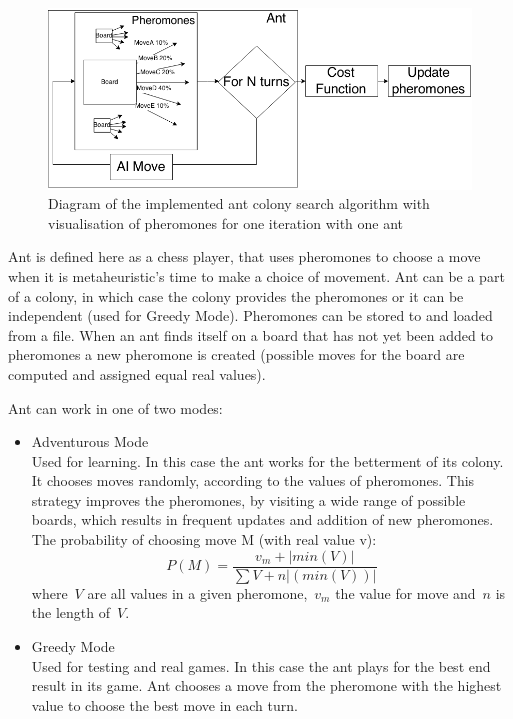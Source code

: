 \documentclass[pdftex]{article}
\begin{document}
\begin{figure}[!htb]
	\centering
	\includegraphics[width=1\textwidth]{ant/pheromones.png} 
	\caption{Diagram of the implemented ant colony search algorithm with visualisation of pheromones for one iteration with one ant}
	\label{fig:pheromones}
\end{figure}

Ant is defined here as a chess player, that uses pheromones to choose a move when it is metaheuristic's time to make a choice of movement. Ant can be a part of a colony, in which case the colony provides the pheromones or it can be independent (used for Greedy Mode). Pheromones can be stored to and loaded from a file. When an ant finds itself on a board that has not yet been added to pheromones a new pheromone is created (possible moves for the board are computed and assigned equal real values).

 Ant can work in one of two modes: 
\begin{itemize}
 	\item Adventurous Mode \hfill \\
		Used for learning. In this case the ant works for the betterment of its colony. It chooses moves randomly, according to the values of pheromones. This strategy improves the pheromones, by visiting a wide range of possible boards, which results in frequent updates and addition of new pheromones. The probability of choosing move M (with real value v):
\begin{equation}
\label{eq:choosingequation}
	P(M) = \frac{v_m + |min(V)|}{\sum V + n|(min(V))|}
\end{equation}
where~$V$ are all values in a given pheromone,~$v_m$ the value for move and~$n$ is the length of~$V$.

	\item Greedy Mode \hfill \\
		Used for testing and real games. In this case the ant plays for the best end result in its game. Ant chooses a move from the pheromone with the highest value to choose the best move in each turn.
\end{itemize}
\end{document}
